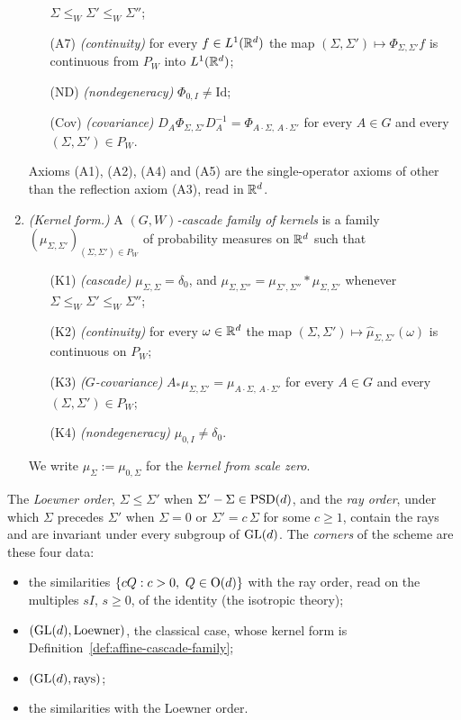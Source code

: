 \begin{definition}
\begin{enumerate}
\begin{enumerate}
$\Sigma \le_W \Sigma' \le_W \Sigma''$;
\item[(A7)] \emph{(continuity)} for every $f \in L^1(\RR^d)$ the map $(\Sigma,\Sigma') \mapsto \Phi_{\Sigma,\Sigma'}f$
is continuous from $P_W$ into $L^1(\RR^d)$;
\item[(ND)] \emph{(nondegeneracy)} $\Phi_{0,I} \ne \mathrm{Id}$;
\item[(Cov)] \emph{(covariance)} $D_A\Phi_{\Sigma,\Sigma'}D_A^{-1} = \Phi_{A\cdot\Sigma,\,A\cdot\Sigma'}$ for every
$A \in G$ and every $(\Sigma,\Sigma') \in P_W$.
\end{enumerate}
Axioms (A1), (A2), (A4) and (A5) are the single-operator axioms of
 other than the reflection axiom (A3), read in $\RR^d$.
\item \emph{(Kernel form.)} A \emph{$(G, W)$-cascade family of kernels} is a family
$(\mu_{\Sigma,\Sigma'})_{(\Sigma,\Sigma') \in P_W}$ of probability measures on $\RR^d$ such that
\begin{enumerate}
\item[(K1)] \emph{(cascade)} $\mu_{\Sigma,\Sigma} = \delta_0$, and
$\mu_{\Sigma,\Sigma''} = \mu_{\Sigma',\Sigma''} * \mu_{\Sigma,\Sigma'}$ whenever
$\Sigma \le_W \Sigma' \le_W \Sigma''$;
\item[(K2)] \emph{(continuity)} for every $\omega \in \mathbb{R}^d$ the map
$(\Sigma,\Sigma') \mapsto \widehat\mu_{\Sigma,\Sigma'}(\omega)$ is continuous on $P_W$;
\item[(K3)] \emph{($G$-covariance)} $A_*\mu_{\Sigma,\Sigma'} = \mu_{A\cdot\Sigma,\,A\cdot\Sigma'}$ for
every $A \in G$ and every $(\Sigma,\Sigma') \in P_W$;
\item[(K4)] \emph{(nondegeneracy)} $\mu_{0,I} \ne \delta_0$.
\end{enumerate}
We write $\mu_\Sigma := \mu_{0,\Sigma}$ for the \emph{kernel from scale zero}.
\end{enumerate}
The \emph{Loewner order}, $\Sigma \le \Sigma'$ when $\Sigma' - \Sigma \in \mathrm{PSD}(d)$, and the
\emph{ray order}, under which $\Sigma$ precedes $\Sigma'$ when $\Sigma = 0$ or $\Sigma' = c\,\Sigma$
for some $c \ge 1$, contain the rays and are invariant under every subgroup of $\mathrm{GL}(d)$. The
\emph{corners} of the scheme are these four data:
\begin{itemize}
\item the similarities $\{cQ : c > 0,\ Q \in \mathrm{O}(d)\}$ with the ray order, read on the multiples
$sI$, $s \ge 0$, of the identity (the isotropic theory);
\item $(\mathrm{GL}(d), \text{Loewner})$, the classical case, whose kernel form is
Definition~\ref{def:affine-cascade-family};
\item $(\mathrm{GL}(d), \text{rays})$;
\item the similarities with the Loewner order.
\end{itemize}
\end{definition}

